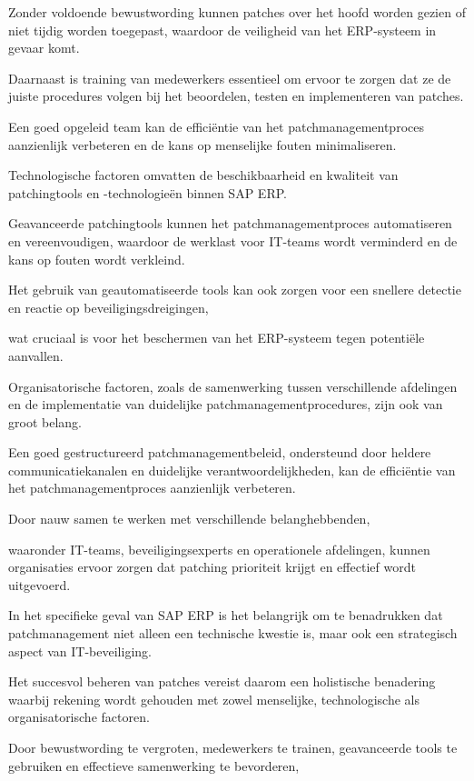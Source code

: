 Zonder voldoende bewustwording kunnen patches over het hoofd worden gezien of niet tijdig worden toegepast, waardoor de veiligheid van het ERP-systeem in gevaar komt. 

Daarnaast is training van medewerkers essentieel om ervoor te zorgen dat ze de juiste procedures volgen bij het beoordelen, testen en implementeren van patches.

Een goed opgeleid team kan de efficiëntie van het patchmanagementproces aanzienlijk verbeteren en de kans op menselijke fouten minimaliseren.

Technologische factoren omvatten de beschikbaarheid en kwaliteit van patchingtools en -technologieën binnen SAP ERP.

Geavanceerde patchingtools kunnen het patchmanagementproces automatiseren en vereenvoudigen, waardoor de werklast voor IT-teams wordt verminderd en de kans op fouten wordt verkleind. 

Het gebruik van geautomatiseerde tools kan ook zorgen voor een snellere detectie en reactie op beveiligingsdreigingen,

wat cruciaal is voor het beschermen van het ERP-systeem tegen potentiële aanvallen.

Organisatorische factoren, zoals de samenwerking tussen verschillende afdelingen en de implementatie van duidelijke patchmanagementprocedures, zijn ook van groot belang. 

Een goed gestructureerd patchmanagementbeleid, ondersteund door heldere communicatiekanalen en duidelijke verantwoordelijkheden, kan de efficiëntie van het patchmanagementproces aanzienlijk verbeteren.

Door nauw samen te werken met verschillende belanghebbenden, 

waaronder IT-teams, beveiligingsexperts en operationele afdelingen, kunnen organisaties ervoor zorgen dat patching prioriteit krijgt en effectief wordt uitgevoerd.


In het specifieke geval van SAP ERP is het belangrijk om te benadrukken dat patchmanagement niet alleen een technische kwestie is, maar ook een strategisch aspect van IT-beveiliging.

Het succesvol beheren van patches vereist daarom een holistische benadering waarbij rekening wordt gehouden met zowel menselijke, technologische als organisatorische factoren.

Door bewustwording te vergroten, medewerkers te trainen, geavanceerde tools te gebruiken en effectieve samenwerking te bevorderen, 

